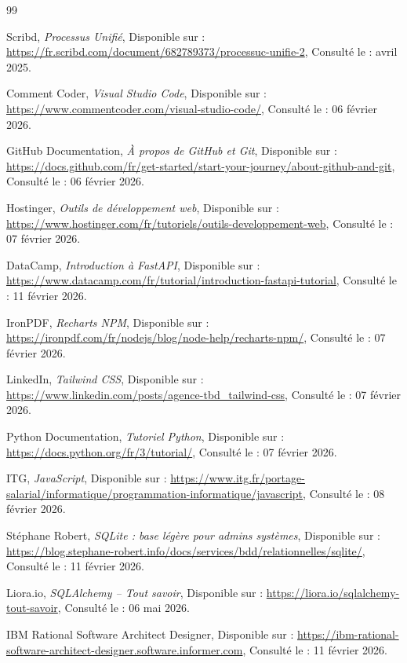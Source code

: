 \documentclass[12pt, oneside, a4paper]{report}
\begin{document}
\renewcommand{\bibname}{Webographie}
\begin{thebibliography}{99}
\raggedright

Scribd,
\textit{Processus Unifié},
Disponible sur : \url{https://fr.scribd.com/document/682789373/processuc-unifie-2},
Consulté le : avril 2025.

Comment Coder,
\textit{Visual Studio Code},
Disponible sur : \url{https://www.commentcoder.com/visual-studio-code/},
Consulté le : 06 février 2026.

GitHub Documentation,
\textit{À propos de GitHub et Git},
Disponible sur : \url{https://docs.github.com/fr/get-started/start-your-journey/about-github-and-git},
Consulté le : 06 février 2026.

Hostinger,
\textit{Outils de développement web},
Disponible sur : \url{https://www.hostinger.com/fr/tutoriels/outils-developpement-web},
Consulté le : 07 février 2026.

DataCamp,
\textit{Introduction à FastAPI},
Disponible sur : \url{https://www.datacamp.com/fr/tutorial/introduction-fastapi-tutorial},
Consulté le : 11 février 2026.

IronPDF,
\textit{Recharts NPM},
Disponible sur : \url{https://ironpdf.com/fr/nodejs/blog/node-help/recharts-npm/},
Consulté le : 07 février 2026.

LinkedIn,
\textit{Tailwind CSS},
Disponible sur : \url{https://www.linkedin.com/posts/agence-tbd_tailwind-css},
Consulté le : 07 février 2026.

Python Documentation,
\textit{Tutoriel Python},
Disponible sur : \url{https://docs.python.org/fr/3/tutorial/},
Consulté le : 07 février 2026.

ITG,
\textit{JavaScript},
Disponible sur : \url{https://www.itg.fr/portage-salarial/informatique/programmation-informatique/javascript},
Consulté le : 08 février 2026.

Stéphane Robert,
\textit{SQLite : base légère pour admins systèmes},
Disponible sur : \url{https://blog.stephane-robert.info/docs/services/bdd/relationnelles/sqlite/},
Consulté le : 11 février 2026.

Liora.io,
\textit{SQLAlchemy -- Tout savoir},
Disponible sur : \url{https://liora.io/sqlalchemy-tout-savoir},
Consulté le : 06 mai 2026.

IBM Rational Software Architect Designer,
Disponible sur : \url{https://ibm-rational-software-architect-designer.software.informer.com},
Consulté le : 11 février 2026.


\end{thebibliography}
\end{document}
